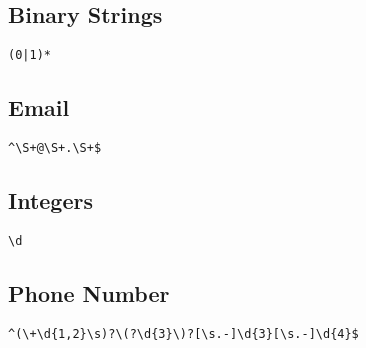 \subsection{Binary Strings}
\begin{verbatim}
(0|1)*
\end{verbatim}
\subsection{Email}
\begin{verbatim}
^\S+@\S+.\S+$
\end{verbatim}
\subsection{Integers}
\begin{verbatim}
\d
\end{verbatim}
\subsection{Phone Number}
\begin{verbatim}
^(\+\d{1,2}\s)?\(?\d{3}\)?[\s.-]\d{3}[\s.-]\d{4}$
\end{verbatim}